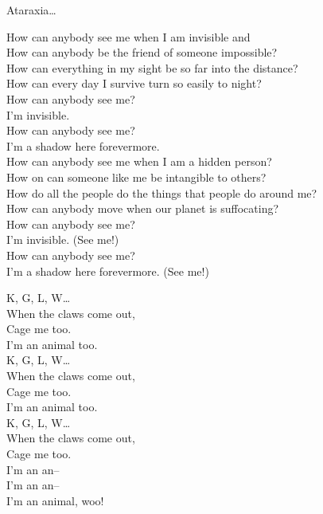 Ataraxia… \\





How can anybody see me when I am invisible and \\
How can anybody be the friend of someone impossible? \\
How can everything in my sight be so far into the distance? \\
How can every day I survive turn so easily to night? \\

How can anybody see me? \\
I'm invisible. \\
How can anybody see me? \\
I'm a shadow here forevermore. \\

How can anybody see me when I am a hidden person? \\
How on  can someone like me be intangible to others? \\
How do all the people do the things that people do around me? \\
How can anybody move when our planet is suffocating? \\

How can anybody see me? \\
I'm invisible. (See me!) \\
How can anybody see me? \\
I'm a shadow here forevermore. (See me!) \\




K, G, L, W… \\

When the claws come out, \\
Cage me too. \\
I'm an animal too. \\

K, G, L, W… \\

When the claws come out, \\
Cage me too. \\
I'm an animal too. \\

K, G, L, W… \\

When the claws come out, \\
Cage me too. \\
I'm an an-- \\
I'm an an-- \\
I'm an animal, woo! \\

